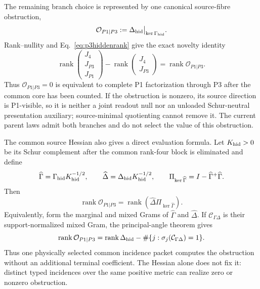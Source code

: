 The remaining branch choice is represented by one canonical source-fibre
obstruction,
\begin{equation}
\mathcal O_{P1|P3}
:=\Delta_{\rm hid}\big|_{\ker\Gamma_{\rm hid}} .
\label{eq:p3obstruction}
\end{equation}
Rank--nullity and Eq.~\eqref{eq:p3hiddenrank} give the exact novelty identity
\begin{equation}
\boxed{
\operatorname{rank}
\begin{pmatrix}J_4\\J_{P3}\\J_{P1}\end{pmatrix}
-
\operatorname{rank}
\begin{pmatrix}J_4\\J_{P3}\end{pmatrix}
=\operatorname{rank}\mathcal O_{P1|P3}.}
\label{eq:p3obstructionrank}
\end{equation}
Thus $\mathcal O_{P1|P3}=0$ is equivalent to complete P1 factorization through
P3 after the common core has been counted.  If the obstruction is nonzero,
its source direction is P1-visible, so it is neither a joint readout null nor
an unloaded Schur-neutral presentation auxiliary; source-minimal quotienting
cannot remove it.  The current parent laws admit both branches and do not
select the value of this obstruction.

The common source Hessian also gives a direct evaluation formula.  Let
$K_{\rm hid}>0$ be its Schur complement after the common rank-four block is
eliminated and define
\begin{equation}
\widehat\Gamma=\Gamma_{\rm hid}K_{\rm hid}^{-1/2},\qquad
\widehat\Delta=\Delta_{\rm hid}K_{\rm hid}^{-1/2},\qquad
\Pi_{\ker\widehat\Gamma}=I-\widehat\Gamma^+\widehat\Gamma .
\end{equation}
Then
\begin{equation}
\boxed{\operatorname{rank}\mathcal O_{P1|P3}
=\operatorname{rank}
\left(\widehat\Delta\Pi_{\ker\widehat\Gamma}\right).}
\label{eq:p3obstructionprojector}
\end{equation}
Equivalently, form the marginal and mixed Grams of $\widehat\Gamma$ and
$\widehat\Delta$.  If $\mathcal C_{\Gamma\Delta}$ is their support-normalized
mixed Gram, the principal-angle theorem gives
\begin{equation}
\operatorname{rank}\mathcal O_{P1|P3}
=\operatorname{rank}\Delta_{\rm hid}
-\#\{j:\sigma_j(\mathcal C_{\Gamma\Delta})=1\}.
\label{eq:p3obstructiongram}
\end{equation}
Thus one physically selected common incidence packet computes the obstruction
without an additional terminal coefficient.  The Hessian alone does not fix
it: distinct typed incidences over the same positive metric can realize zero
or nonzero obstruction.

